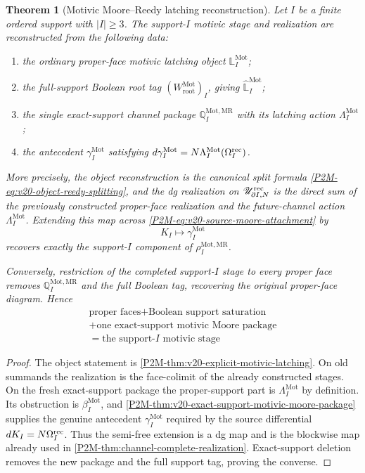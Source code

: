 \documentclass[11pt]{article}
\newtheorem{theorem}{Theorem}[section]
\theoremstyle{remark}
\newcommand{\Mot}{\mathrm{Mot}}
\newcommand{\rootc}{\mathrm{root}}
\newcommand{\MR}{\mathrm{MR}}
\begin{document}
\begin{theorem}[Motivic Moore--Reedy latching reconstruction]
\label{P2M-thm:v20-motivic-moore-reedy-reconstruction}
Let $I$ be a finite ordered support with $|I|\ge3$.  The support-$I$ motivic
stage and realization are reconstructed from the following data:
\begin{enumerate}[label=\textup{(\roman*)}]
\item the ordinary proper-face motivic latching object
      $\mathbb L_I^{\Mot}$;
\item the full-support Boolean root tag
      $(W_{\rootc}^{\Mot})_I$, giving
      $\widehat{\mathbb L}_I^{\Mot}$;
\item the single exact-support channel package
      $\mathbb Q_I^{\Mot,\MR}$ with its latching action
      $\Lambda_I^{\Mot}$;
\item the antecedent $\gamma_I^{\Mot}$ satisfying
      $d\gamma_I^{\Mot}=N\Lambda_I^{\Mot}(\Omega_I^{\rm rec})$.
\end{enumerate}
More precisely, the object reconstruction is the canonical split formula
\eqref{P2M-eq:v20-object-reedy-splitting}, and the dg realization on
$\mathscr U_{\partial I,N}^{\rm rec}$ is the direct sum of the previously
constructed proper-face realization and the future-channel action
$\Lambda_I^{\Mot}$.  Extending this map across
\eqref{P2M-eq:v20-source-moore-attachment} by
\[
 K_I\longmapsto\gamma_I^{\Mot}
\]
recovers exactly the support-$I$ component of
$\rho_I^{\Mot,\MR}$.

Conversely, restriction of the completed support-$I$ stage to every proper
face removes $\mathbb Q_I^{\Mot,\MR}$ and the full Boolean tag, recovering
the original proper-face diagram.  Hence
\[
 \boxed{
 \begin{gathered}
 \text{proper faces}
 +\text{Boolean support saturation}\\
 {}+\text{one exact-support motivic Moore package}\\
 =\text{the support-}I\text{ motivic stage}
 \end{gathered}}
\]
\end{theorem}

\begin{proof}
The object statement is
\cref{P2M-thm:v20-explicit-motivic-latching}.  On old summands the realization is
the face-colimit of the already constructed stages.  On the fresh
exact-support package the proper-support part is
$\Lambda_I^{\Mot}$ by definition.  Its obstruction is
$\beta_I^{\Mot}$, and
\cref{P2M-thm:v20-exact-support-motivic-moore-package} supplies the genuine
antecedent $\gamma_I^{\Mot}$ required by the source differential
$dK_I=N\Omega_I^{\rm rec}$.  Thus the semi-free extension is a dg map and is
the blockwise map already used in
\cref{P2M-thm:channel-complete-realization}.  Exact-support deletion removes the
new package and the full support tag, proving the converse.
\end{proof}
\end{document}
